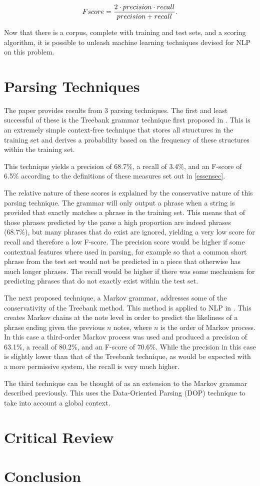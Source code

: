 \documentclass[a4paper,12pt]{article}
\begin{document}
$$ F\-score = \frac{2 \cdot precision \cdot recall}{precision+recall}. $$

Now that there is a corpus, complete with training and test sets, and a scoring algorithm, it is possible to unleash machine learning techniques devised for NLP on this problem.

\section{Parsing Techniques}

The paper provides results from 3 parsing techniques. The first and least successful of these is the Treebank grammar technique first proposed in \cite{Bod93}. This is an extremely simple context-free technique that stores all structures in the training set and derives a probability based on the frequency of these structures within the training set.

This technique yields a precision of 68.7\%, a recall of 3.4\%, and an F-score of 6.5\% according to the definitions of these measures set out in \ref{essensec}.

The relative nature of these scores is explained by the conservative nature of this parsing technique. The grammar will only output a phrase when a string is provided that exactly matches a phrase in the training set. This means that of those phrases predicted by the parse a high proportion are indeed phrases (68.7\%), but many phrases that do exist are ignored, yielding a very low score for recall and therefore a low F-score. The precision score would be higher if some contextual features where used in parsing, for example so that a common short phrase from the test set would not be predicted in a piece that otherwise has much longer phrases. The recall would be higher if there was some mechanism for predicting phrases that do not exactly exist within the test set.

The next proposed technique, a Markov grammar, addresses some of the conservativity of the Treebank method. This method is applied to NLP in \cite{Seneff1992}. This creates Markov chains at the note level in order to predict the likeliness of a phrase ending given the previous $n$ notes, where $n$ is the order of Markov process. In this case a third-order Markov process was used and produced a  precision of 63.1\%, a recall of 80.2\%, and an F-score of 70.6\%. While the precision in this case is slightly lower than that of the Treebank technique, as would be expected with a more permissive system, the recall is very much higher.

The third technique can be thought of as an extension to the Markov grammar described previously. This uses the Data-Oriented Parsing (DOP) technique to take into account a global context. 

\section{Critical Review}

\section{Conclusion}



\end{document}
